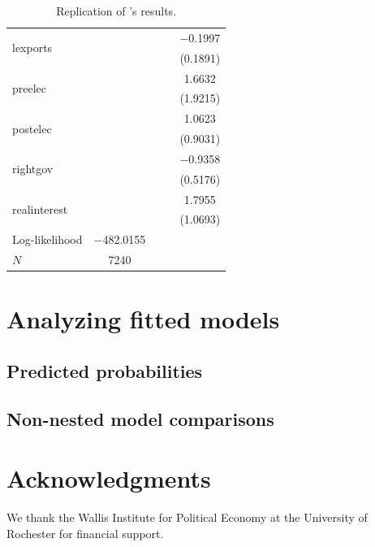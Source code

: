 \documentclass[article]{jss}
\begin{document}
\begin{table}[p]
\begin{table}[htbp]
\begin{center}
\begin{tabular}{lcccc}
\multirow{2}{*}{lexports} & \multirow{2}{*}{} & \multirow{2}{*}{} & \multirow{2}{*}{} & $-$0.1997 \\
 &  &  &  & (0.1891) \\[2pt]
\multirow{2}{*}{preelec} & \multirow{2}{*}{} & \multirow{2}{*}{} & \multirow{2}{*}{} & 1.6632 \\
 &  &  &  & (1.9215) \\[2pt]
\multirow{2}{*}{postelec} & \multirow{2}{*}{} & \multirow{2}{*}{} & \multirow{2}{*}{} & 1.0623 \\
 &  &  &  & (0.9031) \\[2pt]
\multirow{2}{*}{rightgov} & \multirow{2}{*}{} & \multirow{2}{*}{} & \multirow{2}{*}{} & $-$0.9358 \\
 &  &  &  & (0.5176) \\[2pt]
\multirow{2}{*}{realinterest} & \multirow{2}{*}{} & \multirow{2}{*}{} & \multirow{2}{*}{} & 1.7955 \\
 &  &  &  & (1.0693) \\[2pt]
\hline \hline
Log-likelihood & $-$482.0155 \\
 $N$ & 7240\\
\hline
\end{tabular}
\end{center}
\end{table}\caption{Replication of \citeauthor{Leblang2003}'s \citeyearpar{Leblang2003}
  results.}
\label{tab:leb1}
\end{table}

\section{Analyzing fitted models}

\subsection{Predicted probabilities}
\label{sec:pred-prob}

\subsection{Non-nested model comparisons}
\label{sec:non-nest}


\section*{Acknowledgments}

We thank the Wallis Institute for Political Economy at the University of
Rochester for financial support.



\end{document}
